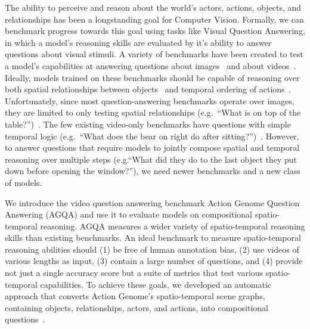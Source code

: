 \documentclass[10pt,twocolumn,letterpaper]{article}
\newcommand{\mgm}[1]{{\color{cyan}{mgm: #1}}}
\begin{document}
The ability to perceive and reason about the world's actors, actions, objects, and relationships has been a longstanding goal for Computer Vision. Formally, we can benchmark progress towards this goal using tasks like Visual Question Answering, in which a model's reasoning skills are evaluated by it's ability to answer questions about visual stimuli. A variety of benchmarks have been created to test a model's capabilities at answering questions about images~\cite{johnson2017clevr,hudson2019gqa,antol2015vqa,zellers2019recognition,goyal2017making,krishna2017visual,zhu2016visual7w,kim2020answering} and about videos~\cite{tapaswi2016movieqa,lei2018tvqa,jang2017tgif,kim2017deepstory,xu2017video,maharaj2017dataset,zeng2016leveraging,yu2019activitynet}. Ideally, models trained on these benchmarks should be capable of reasoning over both spatial relationships between objects~\cite{krishna2017visual,lu2016visual} and temporal ordering of actions~\cite{zacks2001events,ji2020action}. Unfortunately, since most question-answering benchmarks operate over images, they are limited to only testing spatial relationships (e.g.~``What is on top of the table?'')~\cite{hudson2019gqa,krishna2017visual,antol2015vqa}. The few existing video-only benchmarks have questions with simple temporal logic (e.g.~``What does the bear on right do after sitting?'')~\cite{jang2017tgif,xu2017video,maharaj2017dataset,zeng2016leveraging,yu2019activitynet}. \mgm{Think I need more detail here. Add in cleverer and commonsense reasoning} However, to answer questions that require models to jointly compose spatial and temporal reasoning over multiple steps (e.g.``What did they do to the last object they put down before opening the window?''), we need newer benchmarks and a new class of models.

We introduce the video question answering benchmark Action Genome Question Answering (AGQA) and use it to evaluate models on compositional spatio-temporal reasoning. AGQA measures a wider variety of spatio-temporal reasoning skills than existing benchmarks. An ideal benchmark to measure spatio-temporal reasoning abilities should (1) be free of human annotation bias, (2) use videos of various lengths as input, (3) contain a large number of questions, and (4) provide not just a single accuracy score but a suite of metrics that test various spatio-temporal capabilities. To achieve these goals, we developed an automatic approach that converts Action Genome’s spatio-temporal scene graphs, containing objects, relationships, actors, and actions, into compositional questions~\cite{ji2020action}. \mgm{this list came from the HAI thing, but I'm less convinced now on how important 2-3 are to bring up here. May want to bring up compositionality more explicitly since we've pivoted a bit towards that, but also I'll need to have results probably that show that more compositional questions are harder.}
\end{document}
